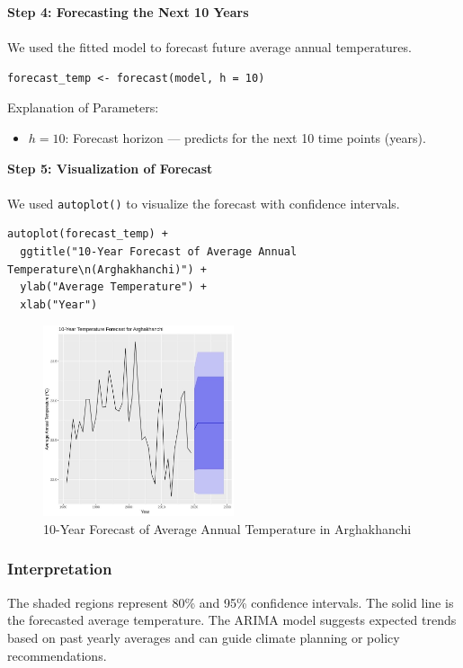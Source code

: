 \textbf{Step 4: Forecasting the Next 10 Years} \\ \\
We used the fitted model to forecast future average annual temperatures.
\begin{verbatim}
forecast_temp <- forecast(model, h = 10)
\end{verbatim}

Explanation of Parameters:
\begin{itemize}
    \item \(h = 10\): Forecast horizon — predicts for the next 10 time points (years).
\end{itemize}

\textbf{Step 5: Visualization of Forecast}\\ \\ 
We used \texttt{autoplot()} to visualize the forecast with confidence intervals.
\begin{verbatim}
autoplot(forecast_temp) + 
  ggtitle("10-Year Forecast of Average Annual Temperature\n(Arghakhanchi)") + 
  ylab("Average Temperature") + 
  xlab("Year")
\end{verbatim}

\begin{figure}[h]
\centering
\includegraphics[width=0.5\textwidth]{figures/Arima.jpg}
\caption{10-Year Forecast of Average Annual Temperature in Arghakhanchi}
\end{figure}

\subsubsection*{Interpretation}
The shaded regions represent 80\% and 95\% confidence intervals. The solid line is the forecasted average temperature. The ARIMA model suggests expected trends based on past yearly averages and can guide climate planning or policy recommendations.
